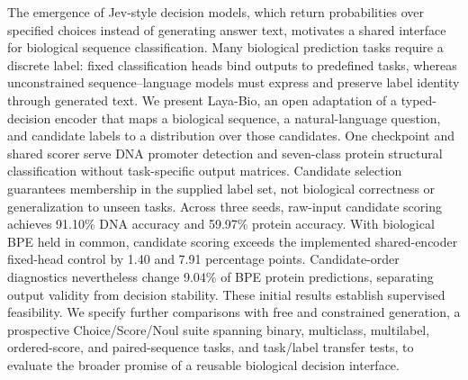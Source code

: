 The emergence of Jev-style decision models, which return probabilities over specified choices instead of generating answer text, motivates a shared interface for biological sequence classification. Many biological prediction tasks require a discrete label: fixed classification heads bind outputs to predefined tasks, whereas unconstrained sequence--language models must express and preserve label identity through generated text. We present Laya-Bio, an open adaptation of a typed-decision encoder that maps a biological sequence, a natural-language question, and candidate labels to a distribution over those candidates. One checkpoint and shared scorer serve DNA promoter detection and seven-class protein structural classification without task-specific output matrices. Candidate selection guarantees membership in the supplied label set, not biological correctness or generalization to unseen tasks. Across three seeds, raw-input candidate scoring achieves 91.10\% DNA accuracy and 59.97\% protein accuracy. With biological BPE held in common, candidate scoring exceeds the implemented shared-encoder fixed-head control by 1.40 and 7.91 percentage points. Candidate-order diagnostics nevertheless change 9.04\% of BPE protein predictions, separating output validity from decision stability. These initial results establish supervised feasibility. We specify further comparisons with free and constrained generation, a prospective Choice/Score/Noul suite spanning binary, multiclass, multilabel, ordered-score, and paired-sequence tasks, and task/label transfer tests, to evaluate the broader promise of a reusable biological decision interface.
